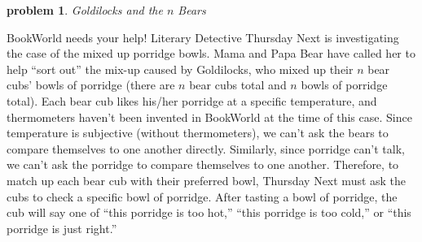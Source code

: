 \documentclass[10pt]{article}
\newtheorem{problem}{\sc\color{cit}problem}
\begin{document}
\begin{problem} Goldilocks and the $n$ Bears \end{problem}

\noindent BookWorld needs your help! Literary Detective Thursday Next is investigating the case of the mixed up porridge bowls.  Mama and Papa Bear have called her to help ``sort out'' the mix-up caused by Goldilocks, who mixed up their $n$ bear cubs' bowls of porridge (there are $n$ bear cubs total and $n$ bowls of porridge total).  Each bear cub likes his/her porridge at a specific temperature, and thermometers haven't been invented in BookWorld at the time of this case.  Since temperature is subjective (without thermometers), we can't ask the bears to compare themselves to one another directly.  Similarly, since porridge can't talk, we can't ask the porridge to compare themselves to one another.  Therefore, to match up each bear cub with their preferred bowl, Thursday Next must ask the cubs to check a specific bowl of porridge.  After tasting a bowl of porridge, the cub will say one of ``this porridge is too hot,'' ``this porridge is too cold,'' or ``this porridge is just right.''
\end{document}
